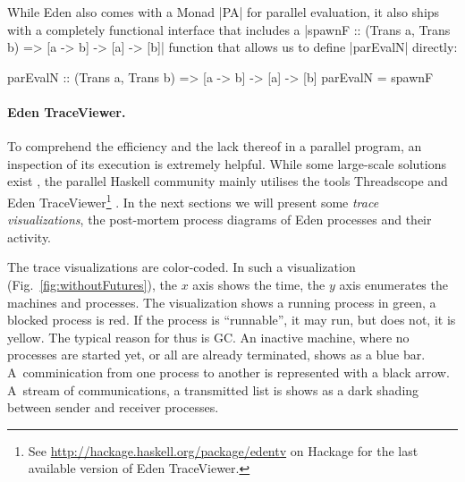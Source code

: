 While Eden also comes with a Monad |PA| for parallel evaluation, it also ships with a completely functional interface that includes
a |spawnF :: (Trans a, Trans b) => [a -> b] -> [a] -> [b]|
function that
allows us to define |parEvalN| directly:

\begin{code}
parEvalN :: (Trans a, Trans b) => [a -> b] -> [a] -> [b]
parEvalN = spawnF 
\end{code}

\paragraph{Eden TraceViewer.}
\label{sec:edentv}
To comprehend the efficiency and the lack thereof in a parallel program, an inspection of its execution is extremely helpful. While some large-scale solutions exist \cite{Geimer2010}, the parallel Haskell community mainly utilises the tools Threadscope \cite{Wheeler2009} and Eden TraceViewer\footnote{See \url{http://hackage.haskell.org/package/edentv} on Hackage for the last available version of Eden TraceViewer.} \cite{Berthold2007a}. In the next sections we will present some \emph{trace visualizations}, the post-mortem process diagrams of Eden processes and their activity.

The trace visualizations are color-coded. In such a visualization (Fig.~\ref{fig:withoutFutures}), the $x$ axis shows the time, the $y$ axis enumerates the machines and processes. The visualization shows a running process in green, a blocked process is red. If the process is \enquote{runnable}, \ie it may run, but does not, it is yellow. The typical reason for thus is GC. An inactive machine, where no processes are started yet, or all are already terminated, shows as a blue bar. A~comminication from one process to another is represented with a black arrow. A~stream of communications, \eg a transmitted list is shows as a dark shading between sender and receiver processes.


